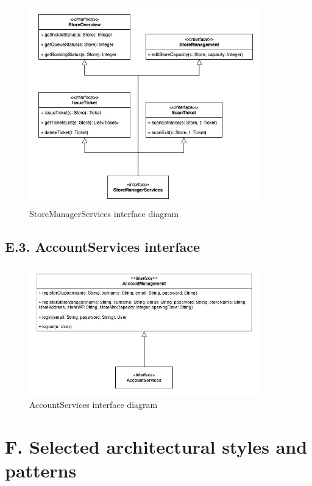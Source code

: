 \begin{figure}[H]
\centering
\includegraphics[width=0.89\textwidth]{component_interface_diagrams/store_manager_component_interface_diagram}
\caption{StoreManagerServices interface diagram}
\end{figure}

\subsection{E.3. AccountServices interface}

\begin{figure}[H]
\centering
\includegraphics[width=0.89\textwidth]{component_interface_diagrams/account_management_component_interface_diagram}
\caption{AccountServices interface diagram}
\end{figure}

\section{F. Selected architectural styles and patterns}

